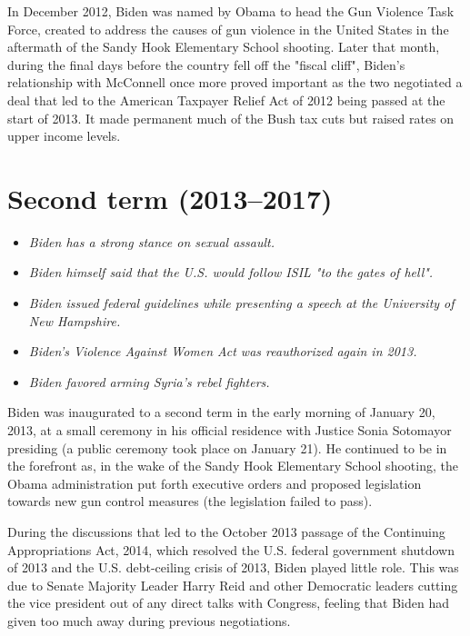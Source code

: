 In December 2012, Biden was named by Obama to head the Gun Violence Task
Force, created to address the causes of gun violence in the United
States in the aftermath of the Sandy Hook Elementary School shooting.
Later that month, during the final days before the country fell off the
"fiscal cliff", Biden's relationship with McConnell once more proved
important as the two negotiated a deal that led to the American Taxpayer
Relief Act of 2012 being passed at the start of 2013. It made permanent
much of the Bush tax cuts but raised rates on upper income levels.

\section{Second term (2013--2017)}\label{second-term-20132017}

\begin{itemize}
\item
  \emph{Biden has a strong stance on sexual assault.}
\item
  \emph{Biden himself said that the U.S. would follow ISIL "to the gates
  of hell".}
\item
  \emph{Biden issued federal guidelines while presenting a speech at the
  University of New Hampshire.}
\item
  \emph{Biden's Violence Against Women Act was reauthorized again in
  2013.}
\item
  \emph{Biden favored arming Syria's rebel fighters.}
\end{itemize}

Biden was inaugurated to a second term in the early morning of January
20, 2013, at a small ceremony in his official residence with Justice
Sonia Sotomayor presiding (a public ceremony took place on January 21).
He continued to be in the forefront as, in the wake of the Sandy Hook
Elementary School shooting, the Obama administration put forth executive
orders and proposed legislation towards new gun control measures (the
legislation failed to pass).

During the discussions that led to the October 2013 passage of the
Continuing Appropriations Act, 2014, which resolved the U.S. federal
government shutdown of 2013 and the U.S. debt-ceiling crisis of 2013,
Biden played little role. This was due to Senate Majority Leader Harry
Reid and other Democratic leaders cutting the vice president out of any
direct talks with Congress, feeling that Biden had given too much away
during previous negotiations.

